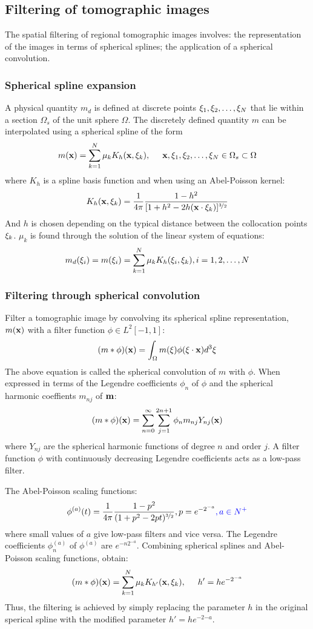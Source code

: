 \subsection{Filtering of tomographic images}
The spatial filtering of regional tomographic images involves: the representation of the images in terms of spherical splines; the application of a spherical convolution.\par
\subsubsection{Spherical spline expansion}
A physical quantity $m_d$ is defined at discrete points $\mathbf{\xi}_1,\mathbf{\xi}_2,\ldots,\mathbf{\xi}_N$ that lie within a section $\Omega_s$ of the unit sphere $\Omega$. The discretely defined quantity $m$ can be interpolated using a spherical spline of the form
\[ m(\mathbf{x})=\sum_{k=1}^N\mu_kK_h(\mathbf{x},\mathbf{\xi}_k), \hspace{5mm} \mathbf{x},\mathbf{\xi}_1,\mathbf{\xi}_2,\ldots,\mathbf{\xi}_N\in\Omega_s\subset\Omega  \]
where $K_h$ is a spline basis function and when using an Abel-Poisson kernel:
\[ K_h(\mathbf{x},\mathbf{\xi}_k)=\frac{1}{4\pi}\frac{1-h^2}{[1+h^2-2h(\mathbf{x}\cdot\mathbf{\xi}_k)]^{\nicefrac{3}{2}}} \]
And $h$ is chosen depending on the typical distance between the collocation points $\mathbf{\xi}_k$. $\mu_k$ is found through the solution of the linear system of equations:
\[ m_d(\mathbf{\xi}_i)=m(\mathbf{\xi}_i)=\sum_{k=1}^N\mu_kK_h(\mathbf{\xi}_i,\mathbf{\xi}_k),i=1,2,\ldots,N \]\par
\subsubsection{Filtering through spherical convolution}
Filter a tomographic image by convolving its spherical spline representation, $m(\mathbf{x})$ with a filter function $\phi\in L^2[-1,1]$:
\[ (m*\phi)(\mathbf{x})=\int_\Omega m(\mathbf{\xi})\phi(\mathbf{\xi}\cdot\mathbf{x})d^3\mathbf{\xi} \]
The above equation is called the spherical convolution of $m$ with $\phi$. When expressed in terms of the Legendre coefficients $\phi_n$ of $\phi$ and the spherical harmonic coeffients $m_{nj}$ of $\mathbf{m}$:
\[ (m*\phi)(\mathbf{x})=\sum_{n=0}^\infty\sum_{j=1}^{2n+1}\phi_nm_{nj}Y_{nj}(\mathbf{x}) \]
where $Y_{nj}$ are the spherical harmonic functions of degree $n$ and order $j$. A filter function $\phi$ with continuously decreasing Legendre coefficients acts as a low-pass filter.\par
The Abel-Poisson scaling functions:
\[ \phi^{(a)}(t)=\frac{1}{4\pi}\frac{1-p^2}{(1+p^2-2pt)^{\nicefrac{3}{2}}},p=e^{-2^{-a}}{\color{blue},a\in N^+} \]
where small values of $a$ give low-pass filters and vice versa. The Legendre coefficients $\phi_n^{(a)}$ of $\phi^{(a)}$ are $e^{-n2^{-a}}$. Combining spherical splines and Abel-Poisson scaling functions, obtain:
\[ (m*\phi)(\mathbf{x})=\sum_{k=1}^N\mu_kK_{h'}(\mathbf{x},\mathbf{\xi}_k), \hspace{5mm} h'=he^{-2^{-a}} \]
Thus, the filtering is achieved by simply replacing the parameter $h$ in the original sperical spline with the modified parameter $h'=he^{-2{-a}}$.\par

